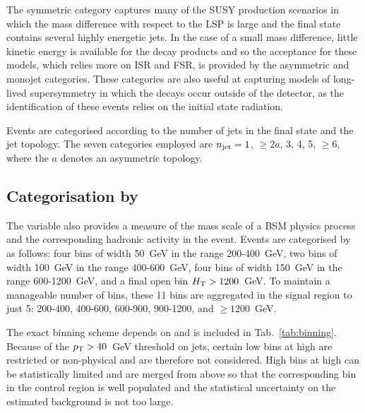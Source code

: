 The symmetric category captures many of the SUSY production scenarios in which 
the mass difference with respect to the LSP is large and the final state 
contains several highly energetic jets. In the case of a small mass difference, 
little kinetic energy is available for the decay products and so the acceptance 
for these models, which relies more on ISR and FSR, is provided by the 
asymmetric and monojet categories. 
These categories are also useful at capturing models of long-lived 
supersymmetry in which the decays occur outside of the detector, as the  
identification of these events relies on the initial state radiation.

Events are categorised according to the number of jets in the final state and 
the jet topology. The seven categories employed are $n_{\text{jet}} = 1$, $\geq2a$, 3, 
4, 5, $\geq6$, where the $a$ denotes an asymmetric topology.

\subsection*{Categorisation by \scalht}

The \scalht variable also provides a measure of the mass scale of a BSM physics 
process and the corresponding hadronic activity in the event. Events are 
categorised by \scalht as follows: four bins of width 50~GeV in the range 
200-400~GeV, two bins of width 100~GeV in the range 400-600~GeV, four bins of 
width 150~GeV in the range 600-1200~GeV, and a final open bin 
$\mbox{$H_\text{T}$}>1200$~GeV. 
To maintain a manageable number of bins,
these 11 bins are aggregated in the signal region to just 5: 200-400, 400-600, 
600-900, 900-1200, and $\geq1200$~GeV.

The exact \scalht binning scheme depends on \njet and is included in 
Tab.~\ref{tab:binning}. Because of the ${p_{\text T}}>40$~GeV threshold on jets, certain 
low \scalht bins at high \njet are restricted or non-physical and are therefore 
not considered. High \scalht bins at high \njet can be statistically limited 
and are merged from above so that the corresponding bin in the control region 
is well populated and the statistical uncertainty on the estimated background  
is not too large.

